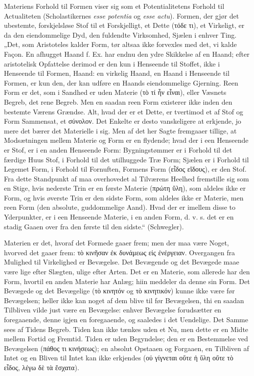 \documentclass[12pt]{book}
\newcommand{\opage}[1]{\marginnote{\footnotesize\textit{[#1]}}}
\begin{document}
Materiens Forhold til Formen viser sig som et Potentialitetens Forhold til Actualiteten
(Scholastikernes \textit{esse potentia} og \textit{esse actu}). Formen, der gjør det ubestemte,
forskjelsløse Stof til et Forskjelligt, et Dette (τόδε τι), et Virkeligt, er da den eiendommelige
Dyd, den fuldendte Virksomhed, Sjælen i enhver Ting. „Det, som Aristoteles
\opage{142} kalder Form, tør altsaa ikke forvexles med det, vi kalde Façon. En afhugget Haand f. Ex. har
endnu den ydre Skikkelse af en Haand; efter aristotelisk Opfattelse derimod er den kun i
Henseende til Stoffet, ikke i Henseende til Formen, Haand: en virkelig Haand, en Haand i
Henseende til Formen, er kun den, der kan udføre en Haands eiendommelige Gjerning. Reen Form er
det, som i Sandhed er uden Materie (τὸ τί ἦν εἶναι), eller Væsnets Begreb, det rene Begreb. Men en
saadan reen Form existerer ikke inden den bestemte Værens Grændse. Alt, hvad der er et Dette, er
tvertimod et af Stof og Form Sammensat, et σύνολον. Det Enkelte er desto vanskeligere at erkjende,
jo mere det bærer det Materielle i sig. Men af det her Sagte fremgaaer tillige, at Modsætningen
mellem Materie og Form er en flydende; hvad der i een Henseende er Stof, er i en anden Henseende
Form: Bygningstømmer er i Forhold til det færdige Huus Stof, i Forhold til det utilhuggede Træ
Form; Sjælen er i Forhold til Legemet Form, i Forhold til Fornuften, Formens Form (εἶδος εἴδους),
er den Stof. Fra dette Standpunkt af maa overhovedet al Tilværens Heelhed fremstille sig som en
Stige, hvis nederste Trin er en første Materie (πρώτη ὕλη), som aldeles ikke er Form, og hvis
øverste Trin er den sidste Form, som aldeles ikke er Materie, men reen Form (den absolute,
guddommelige Aand). Hvad der er imellem disse to Yderpunkter, er i een Henseende Materie, i en
anden Form, d. v. s. det er en stadig Gaaen over fra den første til den sidste.“ (Schwegler).

Materien er det, hvoraf det Formede gaaer frem; men der maa være Noget, hvorved det gaaer frem:
τὸ κινῆσαν ἐκ δυνάμεως εἰς ἐνέργειαν. Overgangen fra Mulighed til Virkelighed er Bevægelse. Det
Bevægende og det Bevægede maae være lige efter Slægten, ulige efter Arten. Det er en Materie, som
allerede har den Form, hvortil en anden Materie har Anlæg; hiin meddeler da denne sin Form. Det
Bevægede og det Bevægelige (τὸ κινητόν og τὸ κινητικόν)
\opage{143} kunne ikke være før Bevægelsen; heller ikke kan noget af dem blive til før Bevægelsen, thi en
saadan Tilbliven vilde just være en Bevægelse: enhver Bevægelse forudsætter en foregaaende, denne
igjen en foregaaende, og saaledes i det Uendelige. Det Samme sees af Tidens Begreb. Tiden kan
ikke tænkes uden et Nu, men dette er en Midte mellem Fortid og Fremtid. Tiden er uden Begyndelse;
den er en Bestemmelse ved Bevægelsen (πάθος τι κινήσεως); en absolut Opstaaen og Forgaaen, en
Tilbliven af Intet og en Bliven til Intet kan ikke erkjendes (οὐ γίγνεται οὔτε ἡ ὕλη οὔτε τὸ
εἶδος, λέγω δὲ τὰ ἔσχατα).
\end{document}
